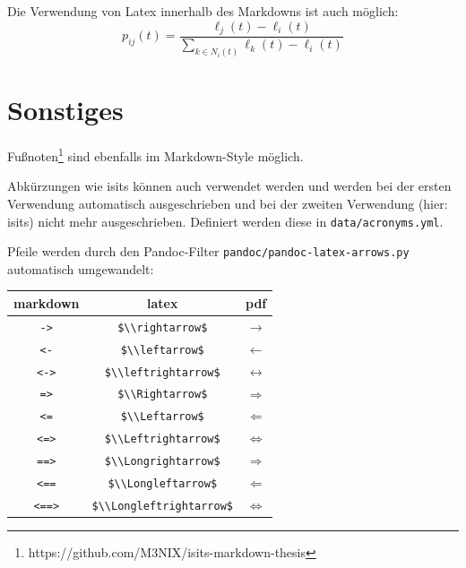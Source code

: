 \documentclass[
  11pt,
  a4paper,
  openright,
  cleardoublepage=plain,
  parskip=half+, %
]{scrreprt}
\newcommand{\passthrough}[1]{#1}
\begin{document}
Die Verwendung von Latex innerhalb des Markdowns ist auch möglich:
\begin{equation}\label{eq:neighbor-propability}
    p_{ij}(t) = \frac{\ell_j(t) - \ell_i(t)}{\sum_{k \in N_i(t)}^{} \ell_k(t) - \ell_i(t)}
\end{equation}

\section{Sonstiges}\label{sonstiges}

Fußnoten\footnote{https://github.com/M3NIX/isits-markdown-thesis} sind
ebenfalls im Markdown-Style möglich.

Abkürzungen wie \ac{isits} können auch verwendet werden und werden bei
der ersten Verwendung automatisch ausgeschrieben und bei der zweiten
Verwendung (hier: \ac{isits}) nicht mehr ausgeschrieben. Definiert
werden diese in \passthrough{\lstinline!data/acronyms.yml!}.

Pfeile werden durch den Pandoc-Filter
\passthrough{\lstinline!pandoc/pandoc-latex-arrows.py!} automatisch
umgewandelt:

\begin{longtable}[]{@{}ccc@{}}
\toprule\noalign{}
markdown & latex & pdf \\
\midrule\noalign{}
\endhead
\bottomrule\noalign{}
\endlastfoot
\passthrough{\lstinline!->!} & \passthrough{\lstinline!$\\rightarrow$!}
& $\rightarrow$ \\
\passthrough{\lstinline!<-!} & \passthrough{\lstinline!$\\leftarrow$!} &
$\leftarrow$ \\
\passthrough{\lstinline!<->!} &
\passthrough{\lstinline!$\\leftrightarrow$!} & $\leftrightarrow$ \\
\passthrough{\lstinline!=>!} & \passthrough{\lstinline!$\\Rightarrow$!}
& $\Rightarrow$ \\
\passthrough{\lstinline!<=!} & \passthrough{\lstinline!$\\Leftarrow$!} &
$\Leftarrow$ \\
\passthrough{\lstinline!<=>!} &
\passthrough{\lstinline!$\\Leftrightarrow$!} & $\Leftrightarrow$ \\
\passthrough{\lstinline!==>!} &
\passthrough{\lstinline!$\\Longrightarrow$!} & $\Longrightarrow$ \\
\passthrough{\lstinline!<==!} &
\passthrough{\lstinline!$\\Longleftarrow$!} & $\Longleftarrow$ \\
\passthrough{\lstinline!<==>!} &
\passthrough{\lstinline!$\\Longleftrightarrow$!} &
$\Longleftrightarrow$ \\
\end{longtable}
\end{document}
